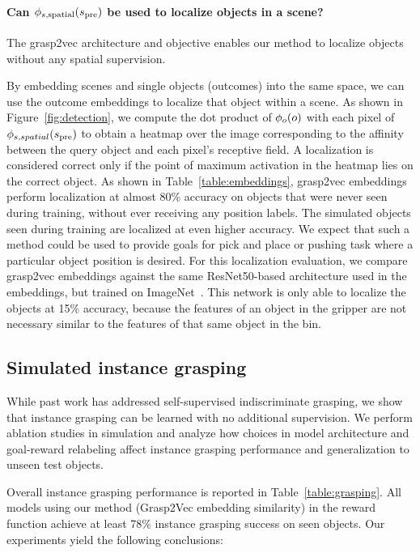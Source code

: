 \documentclass{article}
\begin{document}
\paragraph{ Can $\phi_{s,\text{spatial}}(s_\text{pre})$ be used to localize objects in a scene?} The grasp2vec architecture and objective enables our method to localize  objects without any spatial supervision.

By embedding scenes and single objects (outcomes) into the same space, we can use the outcome embeddings to localize that object within a scene. As shown in Figure~\ref{fig:detection}, we compute the dot product of $\phi_o(o)$ with each pixel of $\phi_{s,spatial}(s_\text{pre})$ to obtain a heatmap over the image corresponding to the affinity between the query object and each pixel's receptive field. A localization is considered correct only if the point of maximum activation in the heatmap lies on the correct object. As shown in Table~\ref{table:embeddings}, grasp2vec embeddings perform localization at almost 80\% accuracy on objects that were never seen during training, without ever receiving any position labels. The simulated objects seen during training are localized at even higher accuracy. We expect that such a method could be used to provide goals for pick and place or pushing task where a particular object position is desired. For this localization evaluation, we compare grasp2vec embeddings against the same ResNet50-based architecture used in the embeddings, but trained on ImageNet~\cite{russakovsky2015imagenet}. This network is only able to localize the objects at 15\% accuracy, because the features of an object in the gripper are not necessary similar to the features of that same object in the bin.

\subsection{Simulated instance grasping}
While past work has addressed self-supervised indiscriminate grasping, we show that instance grasping can be learned with no additional supervision.
We perform ablation studies in simulation and analyze how choices in model architecture and goal-reward relabeling affect instance grasping performance and generalization to unseen test objects.

Overall instance grasping performance is reported in Table~\ref{table:grasping}. All models using our method (Grasp2Vec embedding similarity) in the reward function achieve at least 78\% instance grasping success on seen objects. Our experiments yield the following conclusions:
\end{document}
